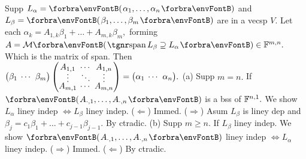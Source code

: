 \ChEnd

\vfill{}
\vspace{8pt}

\BulletPointX\NoteFor{[3.30, 32]}\;\TextB{}
Supp $L_{\alpha}=\Par{\alpha_1,\dots,\alpha_n}$ and $L_{\beta}=\Par{\beta_1,\dots,\beta_m}$ are in a vecsp $V.$\TextB{}
Let each $\alpha_k=A_{1,k}\beta_1+\dots+A_{m,k}\beta_m,$ forming $A=\Mt{\Spn L_\beta\supseteq L_{\alpha}}\in\Fbb^{m,n}.$\TextB{\vspace{3pt}}
Which is {\tgsl the matrix of span}. \;Then ${\normalsize\begin{pmatrix}\beta_1 &\hspace{-6pt} \cdots &\hspace{-6pt} \beta_m\end{pmatrix}\begin{pmatrix}
	A_{1,1} &\hspace{-6pt} \cdots &\hspace{-6pt} A_{1,n}\\[-4pt]
	\vdots	&\hspace{-6pt} \ddots &\hspace{-6pt} \vdots \\[-4pt]
	A_{m,1} &\hspace{-6pt} \cdots &\hspace{-6pt} A_{m,n}
\end{pmatrix}}={\normalsize\begin{pmatrix}\alpha_1 &\hspace{-6pt} \cdots &\hspace{-6pt} \alpha_n\end{pmatrix}}.$\TextB{\vspace{6pt}}
(a) Supp $m=n.$ If $\Par{A_{\cdot,1},\dots,A_{\cdot,n}}$ is a bss of ${\mathbb{F}}^{n,1}.$ We show $L_{\alpha}$ liney indep $\Longleftrightarrow L_{\beta}$ liney indep.\TextB{}
\Ha ($\Leftarrow$) Immed. ($\Rightarrow$) Asum $L_{\beta}$ is liney dep and $\beta_j=c_1\beta_1+\dots+c_{j-1}\beta_{j-1}.$ By ctradic.\PfEnd\vspace{2pt}\TextB{}
(b) Supp $m\geqslant n.$ If $L_{\beta}$ liney indep. We show $\Par{A_{\cdot,1},\dots,A_{\cdot,n}}$ liney indep $\Longleftrightarrow L_{\alpha}$ liney indep.\TextB{}
\Hb ($\Rightarrow$) Immed. ($\Leftarrow$) By ctradic.\PfEnd\TextB{}
